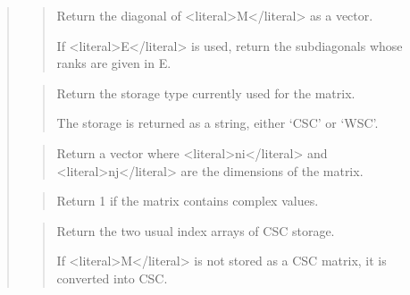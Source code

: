 \documentclass[a4paper,11pt,english]{sphinxmanual}
\begin{document}
\begin{quote}
\begin{quote}
\sphinxAtStartPar
Return the diagonal of \textless{}literal\textgreater{}M\textless{}/literal\textgreater{} as a vector.

\sphinxAtStartPar
If \textless{}literal\textgreater{}E\textless{}/literal\textgreater{} is used, return the sub\sphinxhyphen{}diagonals whose ranks are given in E.
\end{quote}

\sphinxAtStartPar
{}
\begin{quote}

\sphinxAtStartPar
Return the storage type currently used for the matrix.

\sphinxAtStartPar
The storage is returned as a string, either ‘CSC’ or ‘WSC’.
\end{quote}

\sphinxAtStartPar
{}
\begin{quote}

\sphinxAtStartPar
Return a vector where \textless{}literal\textgreater{}ni\textless{}/literal\textgreater{} and \textless{}literal\textgreater{}nj\textless{}/literal\textgreater{} are the dimensions of the matrix.
\end{quote}

\sphinxAtStartPar
{}
\begin{quote}

\sphinxAtStartPar
Return 1 if the matrix contains complex values.
\end{quote}

\sphinxAtStartPar
{}
\begin{quote}

\sphinxAtStartPar
Return the two usual index arrays of CSC storage.

\sphinxAtStartPar
If \textless{}literal\textgreater{}M\textless{}/literal\textgreater{} is not stored as a CSC matrix, it is converted into CSC.
\end{quote}

\sphinxAtStartPar
{}
\begin{quote}


\end{quote}
\end{quote}
\end{document}
